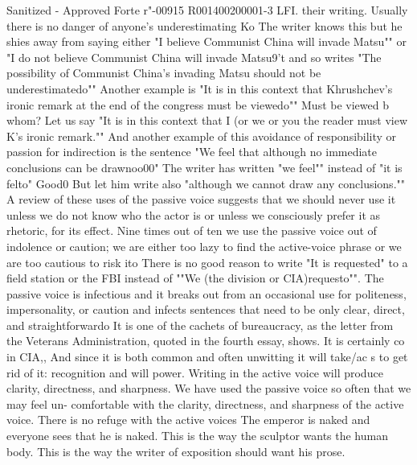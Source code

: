 \documentclass[
    oneside,
    11pt,
    draft
]{memoir}
\begin{document}
Sanitized - Approved Forte r"-00915 R001400200001-3 LFI. their writing. Usually there is no danger of anyone's underestimating Ko The writer knows this but he shies away from saying either "I believe Communist China will invade Matsu"" or "I do not believe Communist China will invade Matsu9't and so writes "The possibility of Communist China's invading Matsu should not be underestimatedo"" Another example is "It is in this context that Khrushchev's ironic remark at the end of the congress must be viewedo"" Must be viewed b whom? Let us say "It is in this context that I (or we or you the reader must view K's ironic remark."" And another example of this avoidance of responsibility or passion for indirection is the sentence "We feel that although no immediate conclusions can be drawnoo00" The writer has written "we feel"" instead of "it is felto" Good0 But let him write also "although we cannot draw any conclusions."" A review of these uses of the passive voice suggests that we should never use it unless we do not know who the actor is or unless we consciously prefer it as rhetoric, for its effect. Nine times out of ten we use the passive voice out of indolence or caution; we are either too lazy to find the active-voice phrase or we are too cautious to risk ito There is no good reason to write "It is requested" to a field station or the FBI instead of ""We (the division or CIA)requesto"". The passive voice is infectious and it breaks out from an occasional use for politeness, impersonality, or caution and infects sentences that need to be only clear, direct, and straightforwardo It is one of the cachets of bureaucracy, as the letter from the Veterans Administration, quoted in the fourth essay, shows. It is certainly co in CIA,, And since it is both common and often unwitting it will take/ac s to get rid of it: recognition and will power. Writing in the active voice will produce clarity, directness, and sharpness. We have used the passive voice so often that we may feel un- comfortable with the clarity, directness, and sharpness of the active voice. There is no refuge with the active voices The emperor is naked and everyone sees that he is naked. This is the way the sculptor wants the human body. This is the way the writer of exposition should want his prose.
\end{document}
